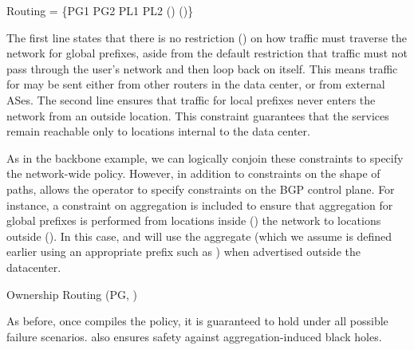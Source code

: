 \begin{code}
\Define Routing = 
    \{PG1 \OR PG2 \Path \Any
     PL1 \OR PL2 \Path \NOT{}\Enter(\Out)
     \True      \Path \Exit(\Out)\}
\end{code}
\noindent
The first line states that there is no restriction (\Any)
on how traffic must
traverse the network for global prefixes, aside from the default restriction
that traffic must not pass through the user's network and then loop
back on itself. This means traffic for
 may be sent either from other routers in the data center, or
from external ASes. The second line ensures that traffic for local
prefixes never enters the network from an outside location. This constraint
guarantees that the services remain reachable only to locations
internal to the data center.

As in the backbone example, we can logically conjoin these constraints
to specify the network-wide policy.
However, in addition to constraints on the shape of paths,
\sysname allows the operator to specify constraints on the BGP control plane.
For instance, a constraint on aggregation is included to ensure that
aggregation for global prefixes is performed from
locations inside (\In) the network to locations outside (\Out). 
In this case,  and  will use the aggregate  
(which we assume is defined earlier using an appropriate prefix such 
as )
when advertised outside the datacenter.

\begin{code}
Ownership \AND{} Routing \AND{} \Agg(PG, \In \Link \Out)
\end{code}

As before, once \sysname compiles the policy, it is guaranteed to hold under all possible failure scenarios. \sysname also ensures safety against aggregation-induced black holes.









